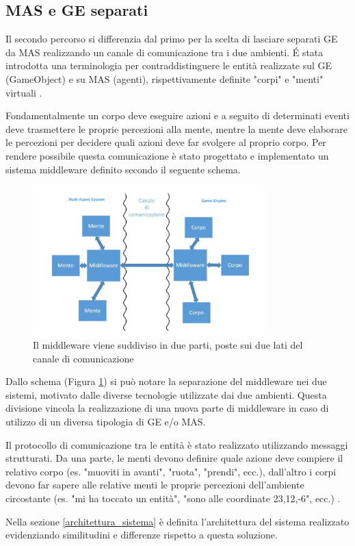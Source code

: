 \subsection{MAS e GE separati} \label{MAS_GE_separati}

Il secondo percorso si differenzia dal primo per la scelta di lasciare separati GE da MAS realizzando un canale di comunicazione tra i due ambienti. \'E stata introdotta una terminologia per contraddistinguere le entità realizzate sul GE (GameObject) e su MAS (agenti), rispettivamente definite "corpi" e "menti" virtuali \cite{amslaurea12270}.

\medskip

Fondamentalmente un corpo deve eseguire azioni e a seguito di determinati eventi deve trasmettere le proprie percezioni alla mente, mentre la mente deve elaborare le percezioni per decidere quali azioni deve far svolgere al proprio corpo. Per rendere possibile questa comunicazione è stato progettato e implementato un sistema middleware definito secondo il seguente schema.

\begin{figure}[H]
\centering
\includegraphics[width=9cm]{figures/Middleware_fuschini.png}
\caption{Il middleware viene suddiviso in due parti, poste sui due lati del canale di comunicazione \cite{amslaurea12270}}
\label{middleware_fuschini}
\end{figure}

Dallo schema (Figura \ref{middleware_fuschini}) si può notare la separazione del middleware nei due sistemi, motivato dalle diverse tecnologie utilizzate dai due ambienti.
 Questa divisione vincola la realizzazione di una nuova parte di middleware in caso di utilizzo di un diversa tipologia di GE e/o MAS.
\medskip

Il protocollo di comunicazione tra le entità è stato realizzato utilizzando messaggi strutturati. Da una parte, le menti devono definire quale azione deve compiere il relativo corpo (es. "muoviti in avanti", "ruota", "prendi", ecc.), dall'altro i corpi devono far sapere alle relative menti le proprie percezioni dell'ambiente circostante (es. "mi ha toccato un entità", "sono alle coordinate 23,12,-6", ecc.) \cite{amslaurea12270}.

\medskip

Nella sezione \ref{architettura_sistema} è definita l'architettura del sistema realizzato evidenziando similitudini e differenze rispetto a questa soluzione. 
